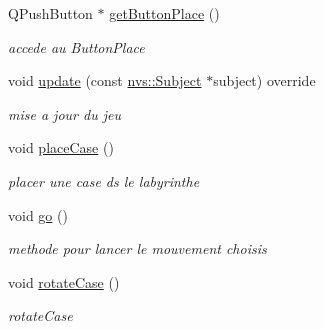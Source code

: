 \begin{DoxyCompactItemize}
Q\+Push\+Button $\ast$ \mbox{\hyperlink{class_window_ab97872ecccc1e1019ca123fb3643c864}{get\+Button\+Place}} ()
\begin{DoxyCompactList}\small\item\em accede au Button\+Place \end{DoxyCompactList}\item 
void \mbox{\hyperlink{class_window_affdeb2564502d9f4ca63e8c0c0c6f7c0}{update}} (const \mbox{\hyperlink{classnvs_1_1_subject}{nvs\+::\+Subject}} $\ast$subject) override
\begin{DoxyCompactList}\small\item\em mise a jour du jeu \end{DoxyCompactList}\item 
\mbox{\label{class_window_a3706148bcb45e3989d378f2b58d58219}} 
void \mbox{\hyperlink{class_window_a3706148bcb45e3989d378f2b58d58219}{place\+Case}} ()
\begin{DoxyCompactList}\small\item\em placer une case ds le labyrinthe \end{DoxyCompactList}\item 
\mbox{\label{class_window_a89ff44536707ce6fce5465b83add9dd4}} 
void \mbox{\hyperlink{class_window_a89ff44536707ce6fce5465b83add9dd4}{go}} ()
\begin{DoxyCompactList}\small\item\em methode pour lancer le mouvement choisis \end{DoxyCompactList}\item 
\mbox{\label{class_window_a455f9cf515c7bc78aa0c02b8530f777a}} 
void \mbox{\hyperlink{class_window_a455f9cf515c7bc78aa0c02b8530f777a}{rotate\+Case}} ()
\begin{DoxyCompactList}\small\item\em rotate\+Case \end{DoxyCompactList}\end{DoxyCompactItemize}
